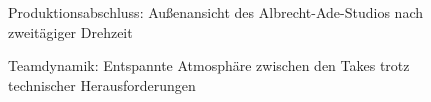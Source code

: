 \FloatBarrier
\begin{figure}[htbp]
    \centering
    \caption{Produktionsabschluss: Außenansicht des Albrecht-Ade-Studios nach zweitägiger Drehzeit}
    \label{fig:studio_exterior}
\end{figure}

\begin{figure}[htbp]
    \centering
    \caption{Teamdynamik: Entspannte Atmosphäre zwischen den Takes trotz technischer Herausforderungen}
    \label{fig:team_atmosphere}
\end{figure}


